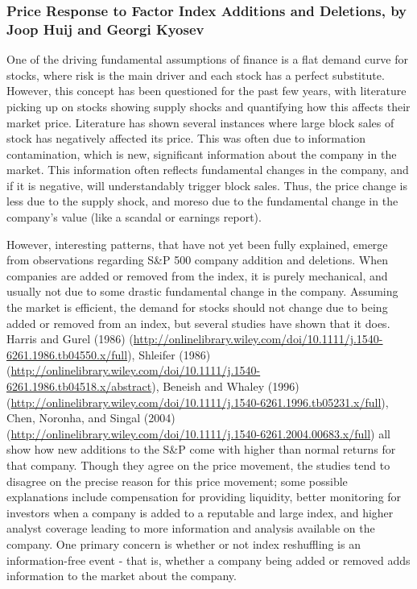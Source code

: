 \documentclass[12pt,twoside]{reedthesis}
\theoremstyle{definition}
\theoremstyle{definition}
\theoremstyle{definition}
\theoremstyle{remark}
\begin{document}
\subsubsection{Price Response to Factor Index Additions and Deletions,
by Joop Huij and Georgi
Kyosev}\label{price-response-to-factor-index-additions-and-deletions-by-joop-huij-and-georgi-kyosev}

One of the driving fundamental assumptions of finance is a flat demand
curve for stocks, where risk is the main driver and each stock has a
perfect substitute. However, this concept has been questioned for the
past few years, with literature picking up on stocks showing supply
shocks and quantifying how this affects their market price. Literature
has shown several instances where large block sales of stock has
negatively affected its price. This was often due to information
contamination, which is new, significant information about the company
in the market. This information often reflects fundamental changes in
the company, and if it is negative, will understandably trigger block
sales. Thus, the price change is less due to the supply shock, and
moreso due to the fundamental change in the company's value (like a
scandal or earnings report).

However, interesting patterns, that have not yet been fully explained,
emerge from observations regarding S\&P 500 company addition and
deletions. When companies are added or removed from the index, it is
purely mechanical, and usually not due to some drastic fundamental
change in the company. Assuming the market is efficient, the demand for
stocks should not change due to being added or removed from an index,
but several studies have shown that it does. Harris and Gurel (1986)
(\url{http://onlinelibrary.wiley.com/doi/10.1111/j.1540-6261.1986.tb04550.x/full}),
Shleifer (1986)
(\url{http://onlinelibrary.wiley.com/doi/10.1111/j.1540-6261.1986.tb04518.x/abstract}),
Beneish and Whaley (1996)
(\url{http://onlinelibrary.wiley.com/doi/10.1111/j.1540-6261.1996.tb05231.x/full}),
Chen, Noronha, and Singal (2004)
(\url{http://onlinelibrary.wiley.com/doi/10.1111/j.1540-6261.2004.00683.x/full})
all show how new additions to the S\&P come with higher than normal
returns for that company. Though they agree on the price movement, the
studies tend to disagree on the precise reason for this price movement;
some possible explanations include compensation for providing liquidity,
better monitoring for investors when a company is added to a reputable
and large index, and higher analyst coverage leading to more information
and analysis available on the company. One primary concern is whether or
not index reshuffling is an information-free event - that is, whether a
company being added or removed adds information to the market about the
company.
\end{document}
